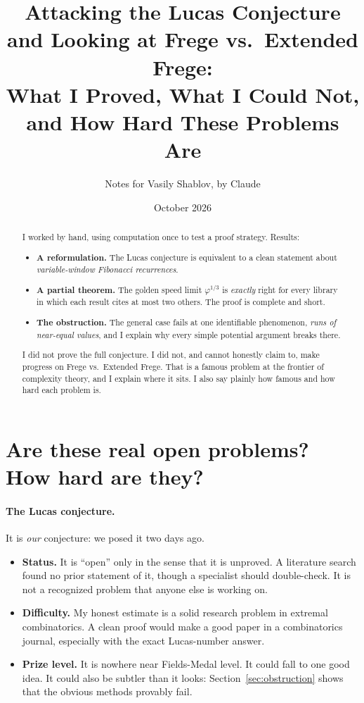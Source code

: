 \documentclass[11pt]{article}
\title{Attacking the Lucas Conjecture and Looking at Frege vs.\ Extended Frege:\\
What I Proved, What I Could Not, and How Hard These Problems Are}
\author{Notes for Vasily Shablov, by Claude}
\date{October 2026}
\theoremstyle{remark}
\begin{document}
\maketitle

\begin{abstract}
I worked by hand, using computation once to test a proof strategy. Results:
\begin{itemize}
\item \textbf{A reformulation.} The Lucas conjecture is equivalent to a clean statement
  about \emph{variable-window Fibonacci recurrences}.
\item \textbf{A partial theorem.} The golden speed limit $\varphi^{1/3}$ is \emph{exactly}
  right for every library in which each result cites at most two others. The proof is
  complete and short.
\item \textbf{The obstruction.} The general case fails at one identifiable phenomenon,
  \emph{runs of near-equal values}, and I explain why every simple potential argument
  breaks there.
\end{itemize}
I did not prove the full conjecture. I did not, and cannot honestly claim to, make progress
on Frege vs.\ Extended Frege. That is a famous problem at the frontier of complexity
theory, and I explain where it sits. I also say plainly how famous and how hard each
problem is.
\end{abstract}

\section{Are these real open problems? How hard are they?}

\paragraph{The Lucas conjecture.} It is \emph{our} conjecture: we posed it two days ago.
\begin{itemize}
\item \textbf{Status.} It is ``open'' only in the sense that it is unproved. A literature
  search found no prior statement of it, though a specialist should double-check. It is
  not a recognized problem that anyone else is working on.
\item \textbf{Difficulty.} My honest estimate is a solid research problem in extremal
  combinatorics. A clean proof would make a good paper in a combinatorics journal,
  especially with the exact Lucas-number answer.
\item \textbf{Prize level.} It is nowhere near Fields-Medal level. It could fall to one
  good idea. It could also be subtler than it looks: Section~\ref{sec:obstruction} shows
  that the obvious methods provably fail.
\end{itemize}
\end{document}
